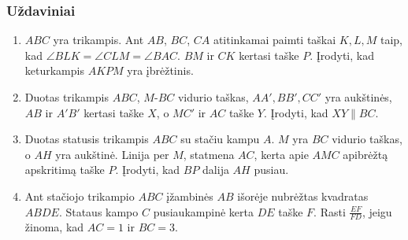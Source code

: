 \subsubsection{Uždaviniai}

\begin{enumerate}
  \item $ABC$ yra trikampis. Ant $AB$, $BC$, $CA$ atitinkamai
    paimti taškai $K,L,M$ taip, kad $\angle BLK=\angle
    CLM=\angle BAC$. $BM$ ir $CK$ kertasi taške $P$. Įrodyti,
    kad keturkampis $AKPM$ yra įbrėžtinis.
  \item Duotas trikampis $ABC$, $M$-$BC$ vidurio taškas,
    $AA',BB',CC'$ yra aukštinės, $AB$ ir $A'B'$ kertasi taške
    $X$, o $MC'$ ir $AC$ taške $Y$. Įrodyti, kad
    $XY\parallel{BC}$.
  \item Duotas statusis trikampis $ABC$ su stačiu kampu $A$.
    $M$ yra $BC$ vidurio taškas, o $AH$ yra aukštinė. Linija
    per $M$, statmena $AC$, kerta apie $AMC$ apibrėžtą
    apskritimą taške $P$. Įrodyti, kad $BP$ dalija $AH$
    pusiau.
  \item Ant stačiojo trikampio $ABC$ įžambinės $AB$ išorėje
    nubrėžtas kvadratas $ABDE$. Stataus kampo $C$
    pusiaukampinė kerta $DE$ taške $F$. Rasti $\frac{EF}{FD}$,
    jeigu žinoma, kad $AC=1$ ir $BC=3$. 

\end{enumerate}
